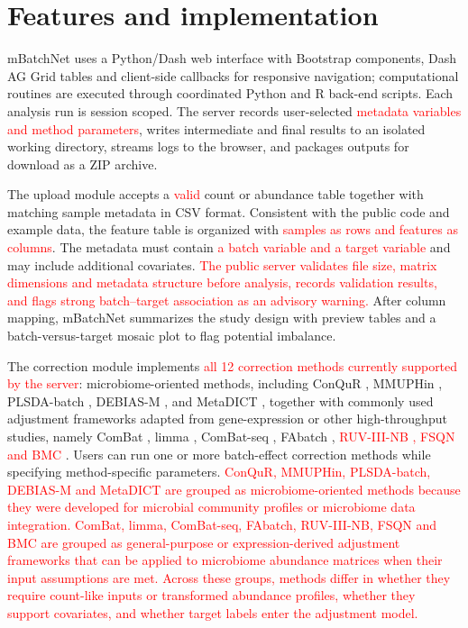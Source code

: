 \documentclass[webpdf,contemporary,large,numbered]{oup-authoring-template}
\providecommand{\rev}[1]{\textcolor{red}{#1}}
\begin{document}
\section{Features and implementation}
mBatchNet uses a Python/Dash web interface with Bootstrap components, Dash AG Grid tables and client-side callbacks for responsive navigation; computational routines are executed through coordinated Python and R back-end scripts. Each analysis run is session scoped. The server records user-selected \rev{metadata variables and method parameters}, writes intermediate and final results to an isolated working directory, streams logs to the browser, and packages outputs for download as a ZIP archive.

The upload module accepts a \rev{valid} count or abundance table together with matching sample metadata in CSV format. Consistent with the public code and example data, the feature table is organized with \rev{samples as rows and features as columns}. The metadata must contain \rev{a batch variable and a target variable} and may include additional covariates. \rev{The public server validates file size, matrix dimensions and metadata structure before analysis, records validation results, and flags strong batch--target association as an advisory warning.} After column mapping, mBatchNet summarizes the study design with preview tables and a batch-versus-target mosaic plot to flag potential imbalance.

The correction module implements \rev{all 12 correction methods currently supported by the server}: microbiome-oriented methods, including ConQuR \citep{Ling2022ConQuR}, MMUPHin \citep{Ma2022MMUPHin}, PLSDA-batch \citep{Wang2023PLSDABatch}, DEBIAS-M \citep{Austin2025DEBIASM}, and MetaDICT \citep{Yuan2025MetaDICT}, together with commonly used adjustment frameworks adapted from gene-expression or other high-throughput studies, namely ComBat \citep{Johnson2007ComBat}, limma \citep{Ritchie2015limma}, ComBat-seq \citep{Zhang2020ComBatSeq}, FAbatch \citep{Hornung2016FAbatch}, \rev{RUV-III-NB \citep{Salim2022RUVIIINB}, FSQN \citep{Franks2018FSQN} and BMC \citep{Sims2008BMC}}.
Users can run one or more batch-effect correction methods while specifying method-specific parameters. \rev{ConQuR, MMUPHin, PLSDA-batch, DEBIAS-M and MetaDICT are grouped as microbiome-oriented methods because they were developed for microbial community profiles or microbiome data integration. ComBat, limma, ComBat-seq, FAbatch, RUV-III-NB, FSQN and BMC are grouped as general-purpose or expression-derived adjustment frameworks that can be applied to microbiome abundance matrices when their input assumptions are met. Across these groups, methods differ in whether they require count-like inputs or transformed abundance profiles, whether they support covariates, and whether target labels enter the adjustment model.}
\end{document}
